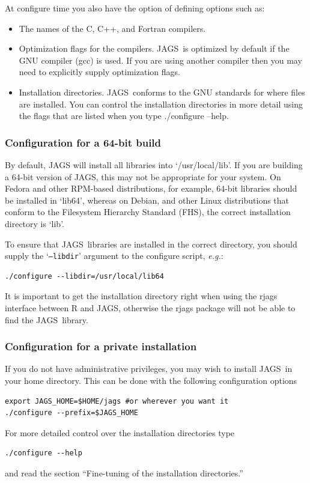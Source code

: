 \documentclass[11pt, a4paper, titlepage]{article}
\newcommand{\JAGS}{\textsf{JAGS}}
\newcommand{\code}[1]{{\bgroup{\normalfont\ttfamily #1}\egroup}}
\newcommand{\samp}[1]{{`\bgroup\normalfont\texttt{#1}'\egroup}}
\newcommand{\file}[1]{{`\normalfont\textsf{#1}'}}
\let\command=\code
\let\option=\samp
\begin{document}
At configure time you also have the option of defining options such
as:
\begin{itemize}
\item The names of the C, C++, and Fortran compilers.  
\item Optimization flags for the compilers.  \JAGS\ is optimized by
  default if the GNU compiler (gcc) is used. If you are using another
  compiler then you may need to explicitly supply optimization flags.
\item Installation directories. \JAGS\ conforms to the GNU standards
  for where files are installed. You can control the installation
  directories in more detail using the flags that are listed when
  you type \command{./configure --help}.
\end{itemize}

\subsubsection{Configuration for a 64-bit build}

By default, JAGS will install all libraries into
\file{/usr/local/lib}.  If you are building a 64-bit version of \JAGS,
this may not be appropriate for your system. On Fedora and other
RPM-based distributions, for example, 64-bit libraries should be
installed in \file{lib64}, whereas on Debian, and other Linux
distributions that conform to the Filesystem Hierarchy Standard (FHS),
the correct installation directory is \file{lib}.

To ensure that \JAGS\ libraries are installed in the correct
directory, you should supply the \option{--libdir} argument to the
configure script, {\em e.g.}:
\begin{verbatim}
./configure --libdir=/usr/local/lib64
\end{verbatim}

It is important to get the installation directory right when using the
\code{rjags} interface between R and \JAGS, otherwise the
\code{rjags} package will not be able to find the \JAGS\ library.

\subsubsection{Configuration for a private installation}

If you do not have administrative privileges, you may wish to install
\JAGS\ in your home directory. This can be done with the following
configuration options
\begin{verbatim}
export JAGS_HOME=$HOME/jags #or wherever you want it
./configure --prefix=$JAGS_HOME
\end{verbatim}
For more detailed control over the installation directories type
\begin{verbatim}
./configure --help
\end{verbatim}
and read the section ``Fine-tuning of the installation directories.''
\end{document}
